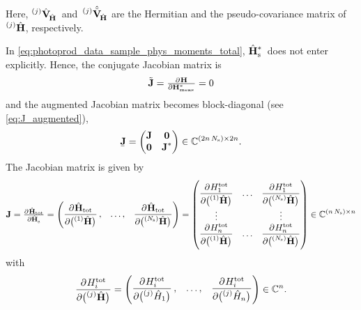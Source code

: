 Here,
$\prescript{(j)}{}{\vphantom{\vect{H}}}\hat{\covMatSym}_{\!\hat{\vect{H}}}$~and~$\prescript{(j)}{}{\vphantom{\vect{H}}}\hat{\tilde{\covMatSym}}_{\!\hat{\vect{H}}}$
are the Hermitian and the pseudo-covariance matrix
of~$\prescript{(j)}{}{\vphantom{\vect{H}}}\hat{\vect{H}}$,
respectively.

In \cref{eq:photoprod_data_sample_phys_moments_total},
$\hat{\bm{\mathrm{H}}}_\text{s}^*$~does not enter explicitly.  Hence, the
conjugate Jacobian matrix is
\begin{equation}
  \tilde{\mat{J}}
  = \pd{\vect{H}}{{\vect{H}_\text{meas}^*}}
  = 0
\end{equation}
and the augmented Jacobian matrix becomes block-diagonal (see
\cref{eq:J_augmented}), \ie
\begin{equation}
  \label{eq:photoprod_data_sample_jacobian_aug}
  \underaccent{\bar}{\mat{J}}
  = \begin{pmatrix*}[c]
    \mat{J} & \mat{0} \\
    \mat{0} & \mat{J}^*
  \end{pmatrix*}
  \in \mathbb{C}^{(2n\, N_\text{s}) \times 2n}.
\end{equation}
The Jacobian matrix is given by
\begin{equation}
  \label{eq:photoprod_data_sample_jacobian}
  \mat{J}
  = \pd{\hat{\vect{H}}_\text{tot}}{\hat{\vect{H}}_\text{s}}
  = \begin{pmatrix}
    \dpd{\hat{\vect{H}}_\text{tot}}{\rBrk[1]{\prescript{(1)}{}{\vphantom{\vect{H}}}\hat{\vect{H}}}}, &
    \ldots, &
    \dpd{\hat{\vect{H}}_\text{tot}}{\rBrk[1]{\prescript{(N_\text{s})}{}{\vphantom{\vect{H}}}\hat{\vect{H}}}}
  \end{pmatrix}
  = \begin{pmatrix}
    \dpd{H_1^\text{tot}}{\rBrk[1]{\prescript{(1)}{}{\vphantom{\vect{H}}}\hat{\vect{H}}}} &
    \ldots &
    \dpd{H_1^\text{tot}}{\rBrk[1]{\prescript{(N_\text{s})}{}{\vphantom{\vect{H}}}\hat{\vect{H}}}} \\
    \vdots & & \vdots \\
    \dpd{H_n^\text{tot}}{\rBrk[1]{\prescript{(1)}{}{\vphantom{\vect{H}}}\hat{\vect{H}}}} &
    \ldots &
    \dpd{H_n^\text{tot}}{\rBrk[1]{\prescript{(N_\text{s})}{}{\vphantom{\vect{H}}}\hat{\vect{H}}}}
  \end{pmatrix}
  \in \mathbb{C}^{(n\, N_\text{s}) \times n}
\end{equation}
with
\begin{equation}
  \dpd{H_i^\text{tot}}{\rBrk[1]{\prescript{(j)}{}{\vphantom{\vect{H}}}\hat{\vect{H}}}}
  = \begin{pmatrix}
    \dpd{H_i^\text{tot}}{\rBrk[1]{\prescript{(j)}{}{\vphantom{H}}\hat{H}_1}}, &
    \ldots, &
    \dpd{H_i^\text{tot}}{\rBrk[1]{\prescript{(j)}{}{\vphantom{H}}\hat{H}_n}}
  \end{pmatrix}
  \in \mathbb{C}^n.
\end{equation}
